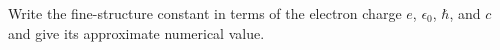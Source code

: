

\vspace*{\fill}
\centering

Write the fine-structure constant in terms of the electron charge $e$, $\epsilon_0$, $\hbar$, and $c$ and give its approximate numerical value.

\centering
\vspace*{\fill}

